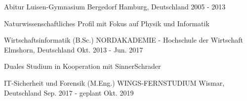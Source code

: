 

\begin{cventries}

  \cventry
    {Abitur} %
    {Luisen-Gymnasium Bergedorf} %
    {Hamburg, Deutschland} %
    {2005 - 2013} %
    {
      \begin{cvitems} %
        \item {Naturwissenschaftliches Profil mit Fokus auf Physik und Informatik}
      \end{cvitems}
    }

  \cventry
    {Wirtschaftsinformatik (B.Sc.)} %
    {NORDAKADEMIE - Hochschule der Wirtschaft} %
    {Elmshorn, Deutschland} %
    {Okt. 2013 - Jun. 2017} %
    {
      \begin{cvitems} %
        \item {Duales Studium in Kooperation mit SinnerSchrader}
      \end{cvitems}
    }

  \cventry
    {IT-Sicherheit und Forensik (M.Eng.)} %
    {WINGS-FERNSTUDIUM} %
    {Wismar, Deutschland} %
    {Sep. 2017 - geplant Okt. 2019} %
    {}

\end{cventries}
